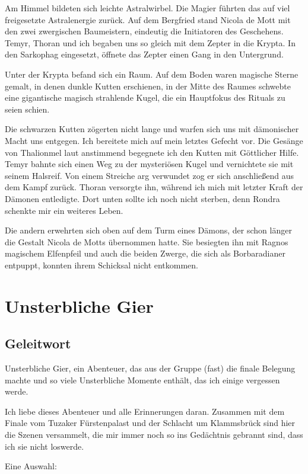 Am Himmel bildeten sich leichte Astralwirbel. Die Magier führten das auf viel freigesetzte Astralenergie zurück. Auf dem Bergfried stand Nicola de Mott mit den zwei zwergischen Baumeistern, eindeutig die Initiatoren des Geschehens. Temyr, Thoran und ich begaben uns so gleich mit dem Zepter in die Krypta. In den Sarkophag eingesetzt, öffnete das Zepter einen Gang in den Untergrund.

Unter der Krypta befand sich ein Raum. Auf dem Boden waren magische Sterne gemalt, in denen dunkle Kutten erschienen, in der Mitte des Raumes schwebte eine gigantische magisch strahlende Kugel, die ein Hauptfokus des Rituals zu seien schien.

Die schwarzen Kutten zögerten nicht lange und warfen sich uns mit dämonischer Macht uns entgegen. Ich bereitete mich auf mein letztes Gefecht vor. Die Gesänge von Thalionmel laut anstimmend begegnete ich den Kutten mit Göttlicher Hilfe. Temyr bahnte sich einen Weg zu der mysteriösen Kugel und vernichtete sie mit seinem Halsreif. Von einem Streiche arg verwundet zog er sich anschließend aus dem Kampf zurück. Thoran versorgte ihn, während ich mich mit letzter Kraft der Dämonen entledigte. Dort unten sollte ich noch nicht sterben, denn Rondra schenkte mir ein weiteres Leben.

Die andern erwehrten sich oben auf dem Turm eines Dämons, der schon länger die Gestalt Nicola de Motts übernommen hatte. Sie besiegten ihn mit Ragnos magischem Elfenpfeil und auch die beiden Zwerge, die sich als Borbaradianer entpuppt, konnten ihrem Schicksal nicht entkommen. 



\chapter{Unsterbliche Gier}

\section{Geleitwort}
Unsterbliche Gier, ein Abenteuer, das aus der Gruppe (fast) die finale  Belegung machte und so viele Unsterbliche Momente enthält, das ich einige vergessen werde.

Ich liebe dieses Abenteuer und alle Erinnerungen daran. Zusammen mit dem Finale vom Tuzaker Fürstenpalast und der Schlacht um Klammsbrück sind hier die Szenen versammelt, die mir immer noch so ins Gedächtnis gebrannt sind, dass ich sie nicht loswerde.

Eine Auswahl:

